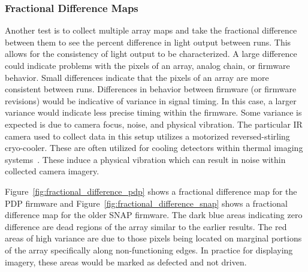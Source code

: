         \subsubsection{Fractional Difference Maps}

            Another test is to collect multiple array maps and take the fractional difference between them to see the percent difference in light output between runs. This allows for the consistency of light output to be characterized. A large difference could indicate problems with the pixels of an array, analog chain, or firmware behavior. Small differences indicate that the pixels of an array are more consistent between runs. Differences in behavior between firmware (or firmware revisions) would be indicative of variance in signal timing. In this case, a larger variance would indicate less precise timing within the firmware. Some variance is expected is due to camera focus, noise, and physical vibration. The particular IR camera used to collect data in this setup utilizes a motorized reversed-stirling cryo-cooler. These are often utilized for cooling detectors within thermal imaging systems~\cite{Organ1999}. These induce a physical vibration which can result in noise within collected camera imagery.

            Figure~\ref{fig:fractional_difference_pdp} shows a fractional difference map for the PDP firmware and Figure~\ref{fig:fractional_difference_snap} shows a fractional difference map for the older SNAP firmware. The dark blue areas indicating zero difference are dead regions of the array similar to the earlier results. The red areas of high variance are due to those pixels being located on marginal portions of the array specifically along non-functioning edges. In practice for displaying imagery, these areas would be marked as defected and not driven.


